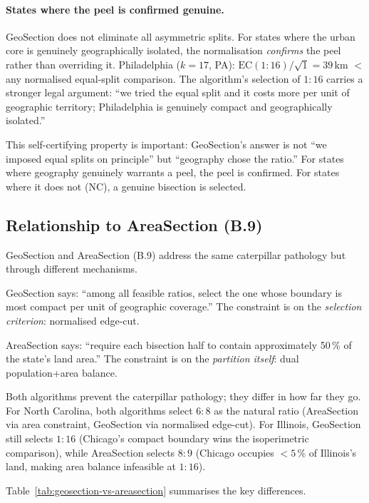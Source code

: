 \paragraph{States where the peel is confirmed genuine.}
GeoSection does not eliminate all asymmetric splits.
For states where the urban core is genuinely geographically isolated, the
normalisation \emph{confirms} the peel rather than overriding it.
Philadelphia ($k=17$, PA): $\mathrm{EC}(1:16)/\sqrt{1} = 39$\,km $<$ any
normalised equal-split comparison.
The algorithm's selection of $1:16$ carries a stronger legal argument:
``we tried the equal split and it costs more per unit of geographic territory;
Philadelphia is genuinely compact and geographically isolated.''

This self-certifying property is important: GeoSection's answer is not ``we
imposed equal splits on principle'' but ``geography chose the ratio.''
For states where geography genuinely warrants a peel, the peel is confirmed.
For states where it does not (NC), a genuine bisection is selected.

\subsection{Relationship to AreaSection (B.9)}

GeoSection and AreaSection (B.9) address the same caterpillar pathology but
through different mechanisms.

GeoSection says: ``among all feasible ratios, select the one whose boundary
is most compact per unit of geographic coverage.''
The constraint is on the \emph{selection criterion}: normalised edge-cut.

AreaSection says: ``require each bisection half to contain approximately
50\,\% of the state's land area.''
The constraint is on the \emph{partition itself}: dual population+area balance.

Both algorithms prevent the caterpillar pathology; they differ in how far
they go.
For North Carolina, both algorithms select $6:8$ as the natural ratio
(AreaSection via area constraint, GeoSection via normalised edge-cut).
For Illinois, GeoSection still selects $1:16$ (Chicago's compact boundary
wins the isoperimetric comparison), while AreaSection selects $8:9$
(Chicago occupies $<5$\,\% of Illinois's land, making area balance infeasible
at $1:16$).

Table~\ref{tab:geosection-vs-areasection} summarises the key differences.

